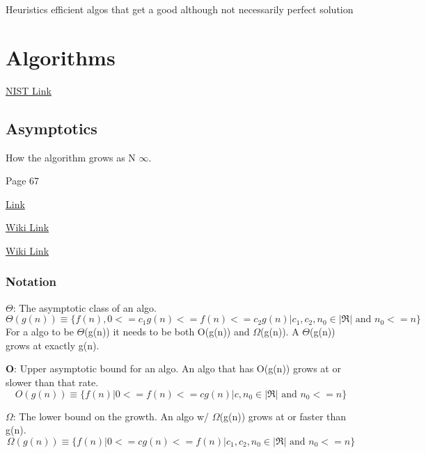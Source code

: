 Heuristics \ra efficient algos that get a good although not necessarily perfect solution
\chapter{Algorithms}

\href{https://xlinux.nist.gov/dads/}{NIST Link}

\section{Asymptotics}
How the algorithm grows as N \ra $\infty$.

 Page 67

\href{http://www.cs.umd.edu/~mount/251/Lects/251lects.pdf}{Link}

\href{https://en.wikipedia.org/wiki/Big_O_notation}{Wiki Link}

\href{https://en.wikipedia.org/wiki/Time_complexity#Constant_time}{Wiki Link}

\subsection{Notation}
	\textbf{$\Theta$}: The asymptotic class of an algo. 
	\begin{equation}
		\Theta(g(n)) \equiv \bigg\{f(n), 0<=c_1g(n)<=f(n)<=c_2g(n) | c_1, c_2, n_0 \in |\Re| \textrm{ and } n_0 <= n \bigg\}
	\end{equation}
	For a algo to be $\Theta$(g(n)) it needs to be both O(g(n)) and $\Omega$(g(n)). A $\Theta$(g(n)) grows at exactly g(n).

	\hspace{11pt}
	
	\textbf{O}: Upper asymptotic bound for an algo. An algo that has O(g(n)) grows at or slower than that rate. 
		\begin{equation}
			O(g(n)) \equiv \bigg\{f(n) | 0<= f(n) <=cg(n) | c, n_0 \in |\Re| \textrm{ and } n_0 <= n \bigg\}
		\end{equation}

	\hspace{11pt}

	\textbf{$\Omega$}: The lower bound on the growth. An algo w/ $\Omega$(g(n)) grows at or faster than g(n). 
		\begin{equation}
			\Omega(g(n)) \equiv \bigg\{f(n) | 0 <= cg(n) <= f(n) | c_1, c_2, n_0 \in |\Re| \textrm{ and } n_0 <= n \bigg\}
		\end{equation}

